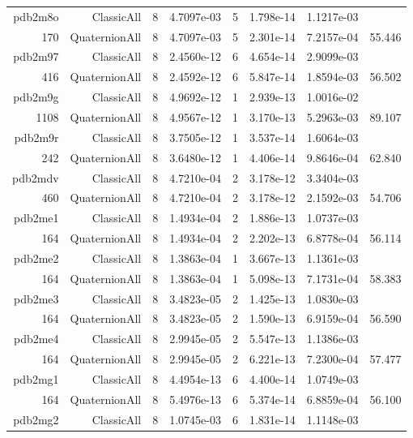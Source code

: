 \begin{xltabular}{\textwidth}{r|rcS[table-format=1.4e+2]cS[table-format=1.3e+2]S[table-format=1.4e+2]S[table-format=-1.3]}
pdb2m8o & ClassicAll & 8 & 4.7097e-03 & 5 & 1.798e-14 & 1.1217e-03 & \\
170 & QuaternionAll & 8 & 4.7097e-03 & 5 & 2.301e-14 & 7.2157e-04 & 55.446\\  \addlinespace
pdb2m97 & ClassicAll & 8 & 2.4560e-12 & 6 & 4.654e-14 & 2.9099e-03 & \\
416 & QuaternionAll & 8 & 2.4592e-12 & 6 & 5.847e-14 & 1.8594e-03 & 56.502\\  \addlinespace
pdb2m9g & ClassicAll & 8 & 4.9692e-12 & 1 & 2.939e-13 & 1.0016e-02 & \\
1108 & QuaternionAll & 8 & 4.9567e-12 & 1 & 3.170e-13 & 5.2963e-03 & 89.107\\  \addlinespace
pdb2m9r & ClassicAll & 8 & 3.7505e-12 & 1 & 3.537e-14 & 1.6064e-03 & \\
242 & QuaternionAll & 8 & 3.6480e-12 & 1 & 4.406e-14 & 9.8646e-04 & 62.840\\  \addlinespace
pdb2mdv & ClassicAll & 8 & 4.7210e-04 & 2 & 3.178e-12 & 3.3404e-03 & \\
460 & QuaternionAll & 8 & 4.7210e-04 & 2 & 3.178e-12 & 2.1592e-03 & 54.706\\  \addlinespace
pdb2me1 & ClassicAll & 8 & 1.4934e-04 & 2 & 1.886e-13 & 1.0737e-03 & \\
164 & QuaternionAll & 8 & 1.4934e-04 & 2 & 2.202e-13 & 6.8778e-04 & 56.114\\  \addlinespace
pdb2me2 & ClassicAll & 8 & 1.3863e-04 & 1 & 3.667e-13 & 1.1361e-03 & \\
164 & QuaternionAll & 8 & 1.3863e-04 & 1 & 5.098e-13 & 7.1731e-04 & 58.383\\  \addlinespace
pdb2me3 & ClassicAll & 8 & 3.4823e-05 & 2 & 1.425e-13 & 1.0830e-03 & \\
164 & QuaternionAll & 8 & 3.4823e-05 & 2 & 1.590e-13 & 6.9159e-04 & 56.590\\  \addlinespace
pdb2me4 & ClassicAll & 8 & 2.9945e-05 & 2 & 5.547e-13 & 1.1386e-03 & \\
164 & QuaternionAll & 8 & 2.9945e-05 & 2 & 6.221e-13 & 7.2300e-04 & 57.477\\  \addlinespace
pdb2mg1 & ClassicAll & 8 & 4.4954e-13 & 6 & 4.400e-14 & 1.0749e-03 & \\
164 & QuaternionAll & 8 & 5.4976e-13 & 6 & 5.374e-14 & 6.8859e-04 & 56.100\\  \addlinespace
pdb2mg2 & ClassicAll & 8 & 1.0745e-03 & 6 & 1.831e-14 & 1.1148e-03 & \\

\end{xltabular}
